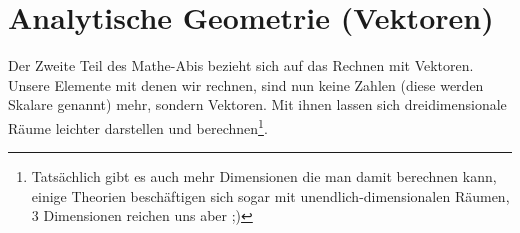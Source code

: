 \chapter{Analytische Geometrie (Vektoren)}
	Der Zweite Teil des Mathe-Abis bezieht sich auf das Rechnen mit Vektoren.
	Unsere Elemente mit denen wir rechnen, sind nun keine Zahlen (diese werden
	Skalare genannt) mehr, sondern Vektoren. Mit ihnen lassen sich dreidimensionale
	Räume leichter darstellen und berechnen\footnote{Tatsächlich gibt es auch mehr
	Dimensionen die man damit berechnen kann, einige Theorien beschäftigen sich
	sogar mit unendlich-dimensionalen Räumen, 3 Dimensionen reichen uns aber ;)}.

	

	

	

	

	